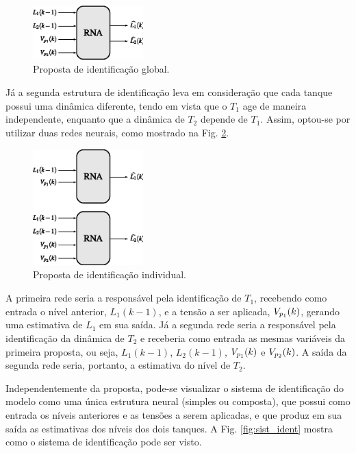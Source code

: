 \begin{figure}[htb]
\centering
    \includegraphics[width=0.38\textwidth]{imgs/sistema/eps/ident_proposta_1}
    \caption{Proposta de identificação global.}
    \label{fig:ident_proposta_1}
\end{figure}

Já a segunda estrutura de identificação leva em consideração que cada tanque
possui uma dinâmica diferente, tendo em vista que o $T_1$ age de maneira
independente, enquanto que a dinâmica de $T_2$ depende de $T_1$. Assim, optou-se
por utilizar duas redes neurais, como mostrado na Fig.
\ref{fig:ident_proposta_2}.

\begin{figure}[htb]
\centering
    \includegraphics[width=0.38\textwidth]{imgs/sistema/eps/ident_proposta_2}
    \caption{Proposta de identificação individual.}
    \label{fig:ident_proposta_2}
\end{figure}

A primeira rede seria a responsável pela identificação de $T_1$, recebendo como
entrada o nível anterior, $L_1(k-1)$, e a tensão a ser aplicada, $V_{p_{\tiny
1}}(k)$, gerando uma estimativa de $L_1$ em sua saída. Já a segunda rede seria a
responsável pela identificação da dinâmica de $T_2$ e receberia como entrada as
mesmas variáveis da primeira proposta, ou seja, $L_1(k-1)$, $L_2(k-1)$,
$V_{p_{\tiny 1}}(k)$ e $V_{p_{\tiny 2}}(k)$. A saída da segunda rede seria,
portanto, a estimativa do nível de $T_2$.

Independentemente da proposta, pode-se visualizar o sistema de identificação do
modelo como uma única estrutura neural (simples ou composta), que possui como
entrada os níveis anteriores e as tensões a serem aplicadas, e que produz em sua
saída as estimativas dos níveis dos dois tanques. A Fig. \ref{fig:sist_ident}
mostra como o sistema de identificação pode ser visto.

